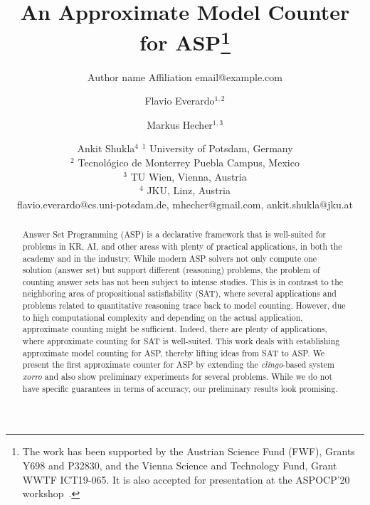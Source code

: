 \documentclass{article}
\title{An Approximate Model Counter for ASP\thanks{The work has been supported by the Austrian Science Fund
    (FWF), Grants Y698 and P32830, 
and the Vienna Science and Technology Fund, Grant WWTF ICT19-065. It is also accepted for presentation at the ASPOCP'20 workshop~\protect\cite{EverardoHecherShukla20}.}}
\author{%
    Author name
    \affiliations
    Affiliation
    \emails
    email@example.com    %
}
\author{%
Flavio Everardo$^{1,2}$\and
Markus Hecher$^{1,3}$\and
Ankit Shukla$^{4}$
\affiliations
$^1$ University of Potsdam, Germany\\
$^2$ Tecnol\'ogico de Monterrey Puebla Campus, Mexico\\
$^3$ TU Wien, Vienna, Austria\\
$^4$ JKU, Linz, Austria\\
\emails
flavio.everardo@cs.uni-potsdam.de,
mhecher@gmail.com,
ankit.shukla@jku.at
}
\newcommand{\sysfont}{\textit}
\newcommand{\clingo}{\sysfont{clingo}}
\newcommand{\xorro}{\sysfont{xorro}}
\begin{document}
\maketitle

\begin{abstract}
Answer Set Programming (ASP) is a declarative framework that is well-suited for problems in KR, AI, and other areas with plenty of practical applications, in both the academy and in the industry.
While modern ASP solvers not only compute one solution (answer set) but support different (reasoning) problems, the problem of counting answer sets has not been subject to intense studies.
This is in contrast to the neighboring area of propositional satisfiability (SAT), where several applications and problems related to quantitative reasoning trace back to model counting. However, due to high computational complexity and depending on the actual application, approximate counting might be sufficient. Indeed, there are plenty of applications, where approximate counting for SAT is well-suited.
This work deals with establishing approximate model counting for ASP, thereby lifting ideas from SAT to ASP.
We present the first approximate counter for ASP by extending the \clingo{}-based system \xorro{} and also show preliminary experiments for several problems.
While we do not have specific guarantees in terms of accuracy, our preliminary results look promising.
\end{abstract}

\end{document}
